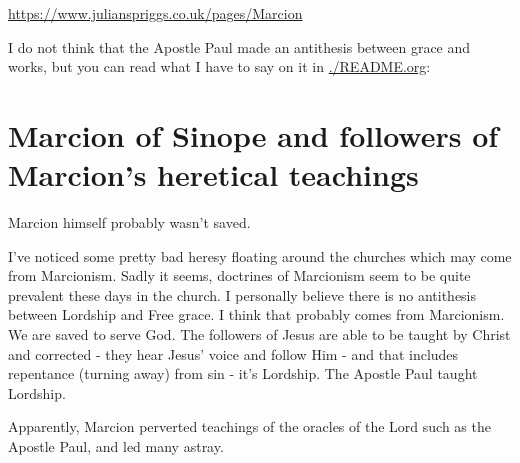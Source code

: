 \documentclass[11pt]{article}
\begin{document}
\url{https://www.julianspriggs.co.uk/pages/Marcion}

I do not think that the Apostle Paul made an antithesis between grace and works, but you can read what I have to say on it in \url{./README.org}:

\section{Marcion of Sinope and followers of Marcion's heretical teachings}
\label{sec:org2ce36ab}
Marcion himself probably wasn't saved.

I've noticed some pretty bad heresy floating around the churches which may come from Marcionism.
Sadly it seems, doctrines of Marcionism seem to be quite prevalent these days in
the church. I personally believe there is no antithesis between Lordship and Free grace. I think that probably comes from Marcionism.
We are saved to serve God. The followers of Jesus are able to be taught by Christ and corrected - they hear Jesus' voice and follow Him - and that includes repentance (turning away) from sin - it's Lordship. The Apostle Paul taught Lordship.

Apparently, Marcion perverted teachings of the oracles of the Lord such as the Apostle Paul, and led many astray.
\end{document}

